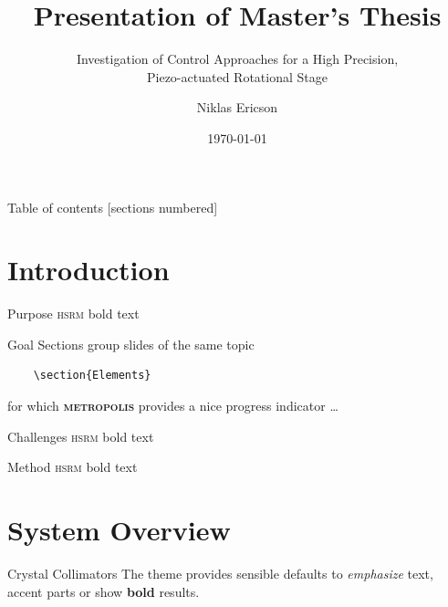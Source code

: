 \documentclass[10pt]{beamer}
\title{Presentation of Master's Thesis}
\subtitle{Investigation of Control Approaches for a High Precision, \\ Piezo-actuated Rotational Stage}
\date{\today}
\author{Niklas Ericson}
\institute{Linköping University | European Organization for Nuclear Research}
\newcommand{\themename}{\textbf{\textsc{metropolis}}\xspace}
\begin{document}
\maketitle

\begin{frame}{Table of contents}
  [sections numbered]
  \tableofcontents[hideallsubsections]
\end{frame}

\section{Introduction}

\begin{frame}[fragile]{Purpose}
  {\textsc{hsrm} bold text}
\end{frame}
\begin{frame}[fragile]{Goal}
  Sections group slides of the same topic

  \begin{verbatim}    \section{Elements}\end{verbatim}

  for which \themename provides a nice progress indicator \ldots
\end{frame}

\begin{frame}[fragile]{Challenges}
  {\textsc{hsrm} bold text}
\end{frame}

\begin{frame}[fragile]{Method}
  {\textsc{hsrm} bold text}
\end{frame}

\section{System Overview}

\begin{frame}[fragile]{Crystal Collimators}
  The theme provides sensible defaults to \emph{emphasize} text,
  \alert{accent} parts or show \textbf{bold} results.
\end{frame}
\end{document}
